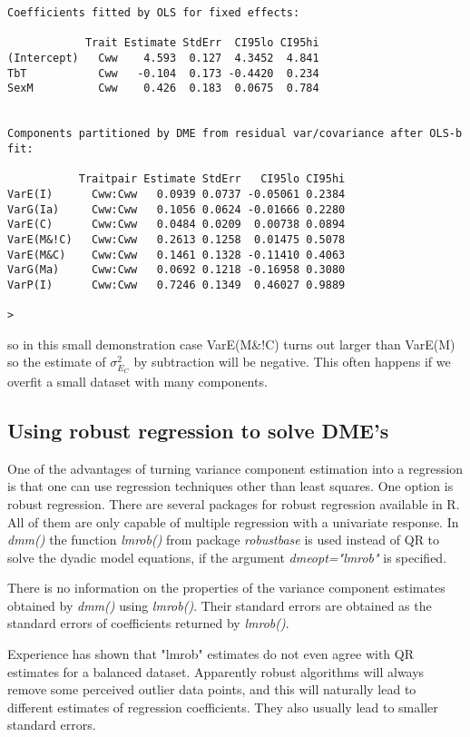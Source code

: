 \documentclass[titlepage]{article}  %
\begin{document}
\begin{verbatim}
Coefficients fitted by OLS for fixed effects:

            Trait Estimate StdErr  CI95lo CI95hi
(Intercept)   Cww    4.593  0.127  4.3452  4.841
TbT           Cww   -0.104  0.173 -0.4420  0.234
SexM          Cww    0.426  0.183  0.0675  0.784


Components partitioned by DME from residual var/covariance after OLS-b fit:

           Traitpair Estimate StdErr   CI95lo CI95hi
VarE(I)      Cww:Cww   0.0939 0.0737 -0.05061 0.2384
VarG(Ia)     Cww:Cww   0.1056 0.0624 -0.01666 0.2280
VarE(C)      Cww:Cww   0.0484 0.0209  0.00738 0.0894
VarE(M&!C)   Cww:Cww   0.2613 0.1258  0.01475 0.5078
VarE(M&C)    Cww:Cww   0.1461 0.1328 -0.11410 0.4063
VarG(Ma)     Cww:Cww   0.0692 0.1218 -0.16958 0.3080
VarP(I)      Cww:Cww   0.7246 0.1349  0.46027 0.9889

> 
\end{verbatim}

so in this small demonstration case VarE(M\&!C) turns out larger than VarE(M) so the estimate of $\sigma^{2}_{E_{C}}$ by subtraction will be negative. This often happens if we overfit a small dataset with many components.

\subsection{Using robust regression to solve DME's}
 
 One of the advantages of turning variance component estimation into a regression is that one can use regression techniques other than least squares. One option is robust regression. There are several packages for robust regression available in R. All of them are only capable of multiple regression with a univariate response.  In {\em dmm()} the function {\em lmrob()} from package {\em robustbase} is used  instead of QR to solve the dyadic model equations, if the argument {\em dmeopt="lmrob"} is specified.

  There is no information on the properties of the variance component estimates obtained by {\em dmm()} using {\em lmrob()}. Their standard errors are obtained as the standard errors of coefficients returned by {\em lmrob()}.

 Experience has shown that "lmrob" estimates do not even agree with QR estimates for a balanced dataset. Apparently robust algorithms will always remove some perceived outlier data points, and this will naturally lead to different estimates of regression coefficients.
They also usually lead to smaller standard errors.
\end{document}

